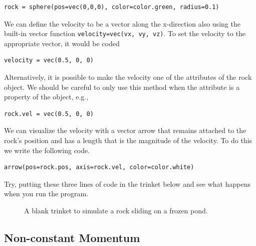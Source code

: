 \documentclass[9pt,arxiv,red]{lapreprint}
\begin{document}
\begin{verbatim}
rock = sphere(pos=vec(0,0,0), color=color.green, radius=0.1)
\end{verbatim}

We can define the velocity to be a vector along the x-direction also using the built-in vector function \texttt{velocity=vec(vx, vy, vz)}. To set the velocity to the appropriate vector, it would be coded

\begin{verbatim}
velocity = vec(0.5, 0, 0)
\end{verbatim}

Alternatively, it is possible to make the velocity one of the attributes of the rock object. We should be careful to only use this method when the attribute is a property of the object, e.g.,

\begin{verbatim}
rock.vel = vec(0.5, 0, 0)
\end{verbatim}

We can visualize the velocity with a vector arrow that remains attached to the rock's position and has a length that is the magnitude of the velocity. To do this we write the following code.

\begin{verbatim}
arrow(pos=rock.pos, axis=rock.vel, color=color.white)
\end{verbatim}

Try, putting these three lines of code in the trinket below and see what happens when you run the program.

\begin{figure}[!htbp]
\centering
\caption[]{A blank trinket to simulate a rock sliding on a frozen pond.}
\label{chap:momentumandcm:blanktrinket}
\end{figure}

\subsection{Non-constant Momentum}
\end{document}
